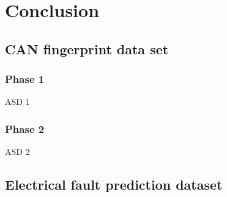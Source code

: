 \chapter{Conclusion}
\section{CAN fingerprint data set}
\subsection{Phase 1}
ASD 1


\subsection{Phase 2}
ASD 2
\section{Electrical fault prediction dataset}
